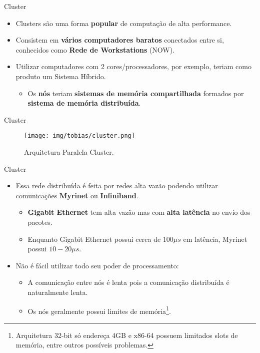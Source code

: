 \begin{frame}{Cluster}
	\begin{itemize}
		\item Clusters são uma forma \textbf{popular} de computação de alta performance.
		\item Consistem em \textbf{vários computadores baratos} conectados entre si, conhecidos como \textbf{Rede de Workstations} (NOW).
		\item Utilizar computadores com 2 cores/processadores, por exemplo, teriam como produto um Sistema Híbrido.
		\begin{itemize}
			\item Os \textbf{nós} teriam \textbf{sistemas de memória compartilhada} formados por \textbf{sistema de memória distribuída}.
		\end{itemize}
	
	\end{itemize}

\end{frame}


\begin{frame}{Cluster}
    \begin{figure}[h]
    	\centering
    	\texttt{[image: img/tobias/cluster.png]}
    	\caption{Arquitetura Paralela Cluster.}
    	\label{fig:ccnuma}
    \end{figure}

\end{frame}


\begin{frame}{Cluster}
    \begin{itemize}
		\item Essa rede distribuída é feita por redes alta vazão podendo utilizar comunicações \textbf{Myrinet} ou \textbf{Infiniband}.
		\begin{itemize}
			\item \textbf{Gigabit Ethernet} tem alta vazão mas com \textbf{alta latência} no envio dos pacotes.
			\item Enquanto Gigabit Ethernet possui cerca de $100\mu s$ em latência, Myrinet possui $10 - 20 \mu s$.
		\end{itemize}

		\item Não é fácil utilizar todo seu poder de processamento:
		\begin{itemize}
			\item A comunicação entre nós é lenta pois a comunicação distribuída é naturalmente lenta.
			\item Os nós geralmente possui limites de memória\footnote{Arquitetura 32-bit só endereça 4GB e x86-64 possuem limitados slots de memória, entre outros possíveis problemas.}.
		\end{itemize}

	\end{itemize}

\end{frame}


